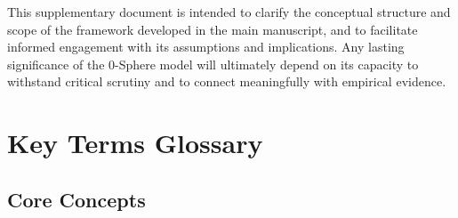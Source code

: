 \documentclass[12pt,letterpaper]{article}
\begin{document}
This supplementary document is intended to clarify the conceptual structure and scope of the framework developed in the main manuscript, and to facilitate informed engagement with its assumptions and implications. Any lasting significance of the 0-Sphere model will ultimately depend on its capacity to withstand critical scrutiny and to connect meaningfully with empirical evidence.


\section*{Key Terms Glossary}


\subsection*{Core Concepts}
\end{document}
